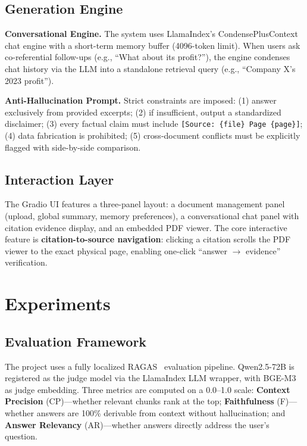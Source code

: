 \documentclass[11pt, a4paper]{article}
\begin{document}
\subsection{Generation Engine}

\textbf{Conversational Engine.} The system uses LlamaIndex's CondensePlusContext chat engine with a short-term memory buffer (4096-token limit). When users ask co-referential follow-ups (e.g., ``What about its profit?''), the engine condenses chat history via the LLM into a standalone retrieval query (e.g., ``Company X's 2023 profit'').

\textbf{Anti-Hallucination Prompt.} Strict constraints are imposed: (1) answer exclusively from provided excerpts; (2) if insufficient, output a standardized disclaimer; (3) every factual claim must include \texttt{[Source: \{file\} Page \{page\}]}; (4) data fabrication is prohibited; (5) cross-document conflicts must be explicitly flagged with side-by-side comparison.

\subsection{Interaction Layer}

The Gradio UI features a three-panel layout: a document management panel (upload, global summary, memory preferences), a conversational chat panel with citation evidence display, and an embedded PDF viewer. The core interactive feature is \textbf{citation-to-source navigation}: clicking a citation scrolls the PDF viewer to the exact physical page, enabling one-click ``answer $\rightarrow$ evidence'' verification.

\section{Experiments}

\subsection{Evaluation Framework}

The project uses a fully localized RAGAS~\cite{ragas} evaluation pipeline. Qwen2.5-72B is registered as the judge model via the LlamaIndex LLM wrapper, with BGE-M3 as judge embedding. Three metrics are computed on a 0.0--1.0 scale: \textbf{Context Precision} (CP)---whether relevant chunks rank at the top; \textbf{Faithfulness} (F)---whether answers are 100\% derivable from context without hallucination; and \textbf{Answer Relevancy} (AR)---whether answers directly address the user's question.
\end{document}
